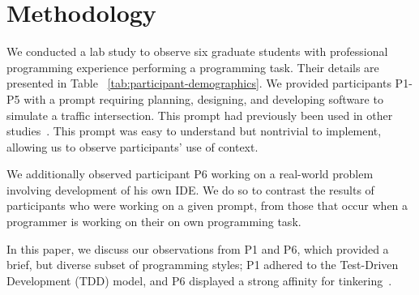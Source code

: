 
\section{Methodology}\label{sec:methodology}


We conducted a lab study to observe six graduate students with professional programming experience performing a programming task. Their details are presented in Table ~\ref{tab:participant-demographics}.
We provided participants P1-P5 with a prompt requiring planning, designing, and developing software to simulate a traffic intersection. This prompt had previously been used in other studies~\cite{Mangano:2012}. This prompt was easy to understand but nontrivial to implement, allowing us to observe participants' use of context. 

We additionally observed participant P6 working on a real-world problem involving development of his own IDE. We do so to contrast the results of participants who were working on a given prompt, from those that occur when a programmer is working on their on own programming task.




In this paper, we discuss our observations from P1 and P6, which provided a brief, but diverse subset of programming styles; P1 adhered to the Test-Driven Development (TDD) model, and P6 displayed a strong affinity for tinkering~\cite{Beckwith:2006}. %


